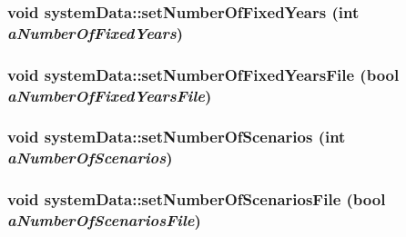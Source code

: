 \label{classsystem_data_a8c57f6c008c35fce32e9bd5acde8bb17}
\hypertarget{classsystem_data_a13a38b26f93adb8b51ed0d9302185f10}{
\subsubsection[{setNumberOfFixedYears}]{\setlength{\rightskip}{0pt plus 5cm}void systemData::setNumberOfFixedYears (int {\em aNumberOfFixedYears})}}
\label{classsystem_data_a13a38b26f93adb8b51ed0d9302185f10}
\hypertarget{classsystem_data_aed859671e3855b1a6f44d177a26f62ff}{
\subsubsection[{setNumberOfFixedYearsFile}]{\setlength{\rightskip}{0pt plus 5cm}void systemData::setNumberOfFixedYearsFile (bool {\em aNumberOfFixedYearsFile})}}
\label{classsystem_data_aed859671e3855b1a6f44d177a26f62ff}
\hypertarget{classsystem_data_a6c969d22bdbb856439b2e34ab91c222d}{
\subsubsection[{setNumberOfScenarios}]{\setlength{\rightskip}{0pt plus 5cm}void systemData::setNumberOfScenarios (int {\em aNumberOfScenarios})}}
\label{classsystem_data_a6c969d22bdbb856439b2e34ab91c222d}
\hypertarget{classsystem_data_ac5f549e017b249ee28cc205dd447927f}{
\subsubsection[{setNumberOfScenariosFile}]{\setlength{\rightskip}{0pt plus 5cm}void systemData::setNumberOfScenariosFile (bool {\em aNumberOfScenariosFile})}}

